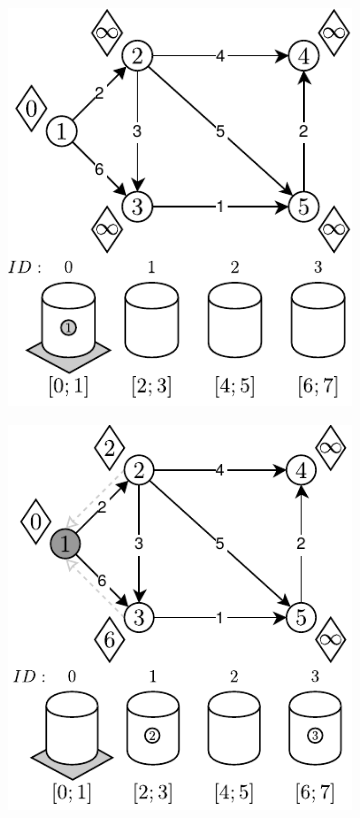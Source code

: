 \begin{figure}[!htbp]
	\centering
	\null\hfill
	\begin{subfigure}[b]{0.27\textwidth}
		\includegraphics[width=\textwidth]{Chapter_II/APROXIMATE-BUCKETS-Example/a.pdf}
		\caption{}
		\label{fig:exampleAproximateBuckets:a}
	\end{subfigure}
	\hfill
	\begin{subfigure}[b]{0.27\textwidth}
		\includegraphics[width=\textwidth]{Chapter_II/APROXIMATE-BUCKETS-Example/b.pdf}

\end{subfigure}
\end{figure}
